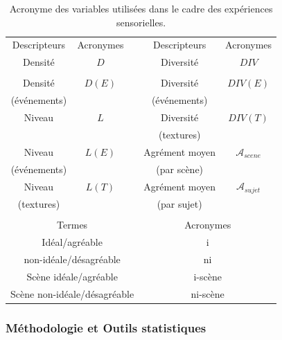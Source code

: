 \begin{table}[t]
\centering
\begin{tabular}{c c c c c} 
Descripteurs          & Acronymes   &   & Descripteurs            & Acronymes  \\                       
\cline{1-2} \cline{4-5}
Densité               & $D$         &   & Diversité               & $DIV$    \\
                      &             &   &                         &          \\
Densité               & $D(E)$      &   & Diversité               & $DIV(E)$ \\
(événements)          &             &   & (événements)            &          \\
Niveau                & $L$         &   & Diversité               & $DIV(T)$ \\
                      &             &   & (textures)              &          \\
Niveau                & $L(E)$      &   & Agrément moyen          & $\mathcal{A}_{scene}$     \\
(événements)          &             &   & (par scène)             &         \\
Niveau                & $L(T)$      &   & Agrément moyen          & $\mathcal{A}_{sujet}$        \\
(textures)            &             &   & (par sujet)             &      \\
                      &             &   &                         &      \\
\multicolumn{3}{c}{Termes} &  \multicolumn{2}{c}{Acronymes} \\ 
\hline
\multicolumn{3}{c}{Idéal/agréable}                 & \multicolumn{2}{c}{i}       \\
\multicolumn{3}{c}{non-idéale/désagréable}         & \multicolumn{2}{c}{ni}      \\
\multicolumn{3}{c}{Scène idéale/agréable}          & \multicolumn{2}{c}{i-scène} \\
\multicolumn{3}{c}{Scène non-idéale/désagréable}   & \multicolumn{2}{c}{ni-scène} \\
\hline
\end{tabular}
\vspace{0.5mm}
\caption{Acronyme des variables utilisées dans le cadre des expériences sensorielles.}
\label{tab:acronyme}
\end{table}


\subsubsection{Méthodologie et Outils statistiques}
\label{sec:ch5_methodoEtStat1}

